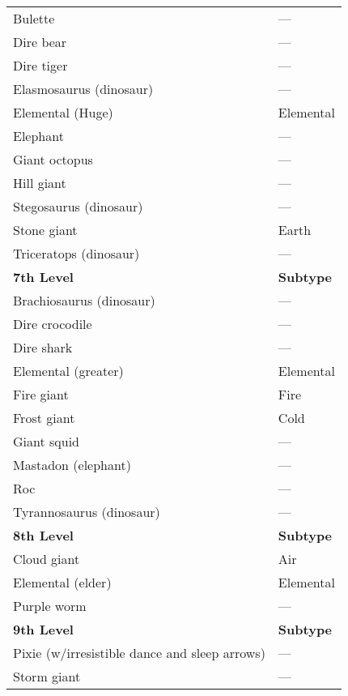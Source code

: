 \begin{xtabular}{ll}
Bulette                                       & ---                \\
Dire bear                                     & ---                \\
Dire tiger                                    & ---                \\
Elasmosaurus (dinosaur)                       & ---                \\
Elemental (Huge)                              & Elemental        \\
Elephant                                      & ---                \\
Giant octopus                                 & ---                \\
Hill giant                                    & ---                \\
Stegosaurus (dinosaur)                        & ---                \\
Stone giant                                   & Earth            \\
Triceratops (dinosaur)                        & ---                \\
\textbf{7th Level}                            & \textbf{Subtype} \\
Brachiosaurus (dinosaur)                      & ---                \\
Dire crocodile                                & ---                \\
Dire shark                                    & ---                \\
Elemental (greater)                           & Elemental        \\
Fire giant                                    & Fire             \\
Frost giant                                   & Cold             \\
Giant squid                                   & ---                \\
Mastadon (elephant)                           & ---                \\
Roc                                           & ---                \\
Tyrannosaurus (dinosaur)                      & ---                \\
\textbf{8th Level}                            & \textbf{Subtype} \\
Cloud giant                                   & Air              \\
Elemental (elder)                             & Elemental        \\
Purple worm                                   & ---                \\
\textbf{9th Level}                            & \textbf{Subtype} \\
Pixie (w/irresistible dance and sleep arrows) & ---                \\
Storm giant                                   & ---               
\end{xtabular}


